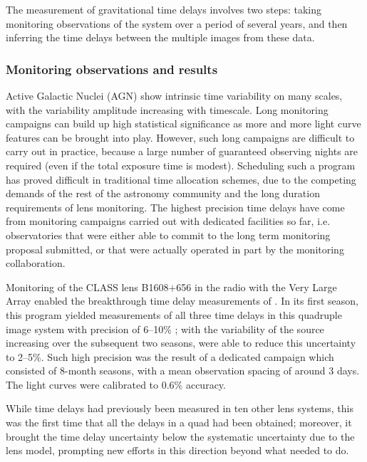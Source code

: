 The measurement of gravitational time delays involves two steps:  taking
monitoring observations of the system over a period of several years,
and then inferring the time delays between the multiple images from
these data.


\subsubsection{Monitoring observations and results}

Active Galactic Nuclei (AGN) show intrinsic time variability on many
scales, with the variability amplitude increasing with timescale. Long
monitoring campaigns can build up high statistical significance as
more and more light curve features can be brought into play.  However,
such long campaigns are difficult to carry out in practice, because a
large number of guaranteed observing nights are required (even if the
total exposure time is modest). Scheduling such a program has proved
difficult in traditional time allocation schemes, due to the competing
demands of the rest of the astronomy community and the long duration
requirements of lens monitoring. The highest precision time delays
have come from monitoring campaigns carried out with dedicated
facilities so far, i.e. observatories that were either able to commit
to the long term monitoring proposal submitted, or that were actually
operated in part by the monitoring collaboration.


Monitoring of the CLASS lens B1608$+$656 in the radio with the Very
Large Array enabled the breakthrough  time delay measurements of
\citep{Fas++02}. In its first season, this program  yielded measurements
of all three time delays in this quadruple image system with precision
of 6--10\% \citep{Fas++99}; with the variability of the source
increasing over the subsequent two seasons, \citep{Fas++02} were able
to reduce this uncertainty to 2--5\%. Such high precision was the
result of a dedicated campaign which consisted of 8-month seasons,
with a mean observation spacing of around 3 days. The light curves
were calibrated to 0.6\% accuracy.

While time delays had previously been measured in ten other lens
systems, this was the first time that all the delays in a quad had
been obtained; moreover, it brought the time delay uncertainty below
the systematic uncertainty due to the lens model, prompting new
efforts in this direction beyond what \citet{K+F99} needed to do.

